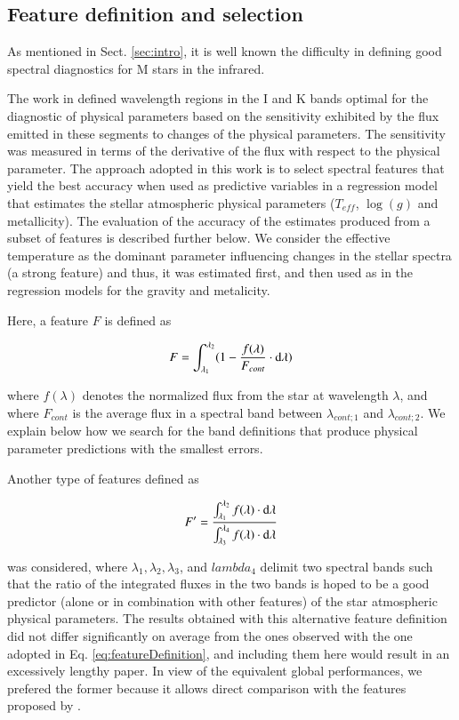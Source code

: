 \subsection{Feature definition and selection}
\label{subsec:FD}
As mentioned in Sect. \ref{sec:intro}, it is well known the
difficulty in defining good spectral diagnostics for M stars in the
infrared.

The work in \cite{cesetti} defined wavelength regions in the I and K
bands optimal for the diagnostic of physical parameters based on the
sensitivity exhibited by the flux emitted in these segments to changes
of the physical parameters. The sensitivity was measured in terms of
the derivative of the flux with respect to the physical parameter. The
approach adopted in this work is to select spectral features that
yield the best accuracy when used as predictive variables in a
regression model that estimates the stellar atmospheric physical
parameters ($T_{eff}$, $\log(g)$ and metallicity). The evaluation of
the accuracy of the estimates produced from a subset of features is
described further below. We consider the effective temperature as the
dominant parameter influencing changes in the stellar spectra (a
strong feature) and thus, it was estimated first, and then used as in
the regression models for the gravity and metalicity.

Here, a feature $F$ is defined as

\begin{equation}\label{eq:featureDefinition}
  F = \int_{\lambda_{1}}^{\lambda_{2}} (1-\frac{f(\lambda)}{F_{cont}} \cdot {\rm d}{\lambda})
\end{equation}

where $f(\lambda)$ denotes the normalized flux from the star at
wavelength $\lambda$, and where $F_{cont}$ is the average flux in a
spectral band between $\lambda_{cont;1}$ and $\lambda_{cont;2}$. We
explain below how we search for the band definitions that produce
physical parameter predictions with the smallest errors.

Another type of features defined as

\begin{equation}\label{eq:feature2}
  F' = \frac{ \int_{\lambda_{1}}^{\lambda_{2}}f(\lambda) \cdot {\rm d}{\lambda}}
               {\int_{\lambda_{3}}^{\lambda_{4}} f(\lambda) \cdot {\rm d}{\lambda}} 
\end{equation}

was considered, where $\lambda_1, \lambda_2, \lambda_3$, and
$lambda_4$ delimit two spectral bands such that the ratio of the
integrated fluxes in the two bands is hoped to be a good predictor
(alone or in combination with other features) of the star atmospheric
physical parameters. The results obtained with this alternative
feature definition did not differ significantly on average from the
ones observed with the one adopted in Eq. \ref{eq:featureDefinition}, and
including them here would result in an excessively lengthy paper. In
view of the equivalent global performances, we prefered the former
because it allows direct comparison with the features proposed
by \cite{cesetti}.

